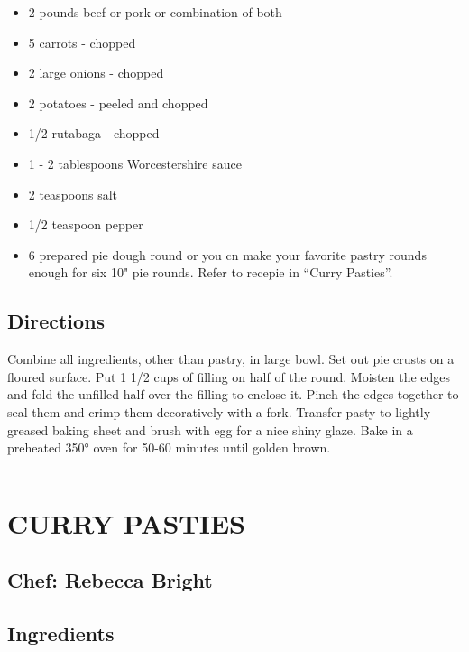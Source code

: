 \documentclass[
]{book}
\providecommand{\tightlist}{%
  \setlength{\itemsep}{0pt}\setlength{\parskip}{0pt}}
\begin{document}
\begin{itemize}
\tightlist
\item
  2 pounds beef or pork or combination of both
\item
  5 carrots - chopped
\item
  2 large onions - chopped
\item
  2 potatoes - peeled and chopped
\item
  1/2 rutabaga - chopped
\item
  1 - 2 tablespoons Worcestershire sauce
\item
  2 teaspoons salt
\item
  1/2 teaspoon pepper
\item
  6 prepared pie dough round or you cn make your favorite pastry rounds enough for six 10" pie rounds. Refer to recepie in ``Curry Pasties''.
\end{itemize}

\hypertarget{directions-52}{%
\subsection*{Directions}\label{directions-52}}


Combine all ingredients, other than pastry, in large bowl. Set out pie crusts on a floured surface. Put 1 1/2 cups of filling on half of the round. Moisten the edges and fold the unfilled half over the filling to enclose it. Pinch the edges together to seal them and crimp them decoratively with a fork. Transfer pasty to lightly greased baking sheet and brush with egg for a nice shiny glaze. Bake in a preheated 350° oven for 50-60 minutes until golden brown.

\begin{center}\rule{0.5\linewidth}{0.5pt}\end{center}

\hypertarget{curry-pasties}{%
\section*{CURRY PASTIES}\label{curry-pasties}}


\hypertarget{chef-rebecca-bright-1}{%
\subsection*{Chef: Rebecca Bright}\label{chef-rebecca-bright-1}}


\hypertarget{ingredients-53}{%
\subsection*{Ingredients}\label{ingredients-53}}
\end{document}
